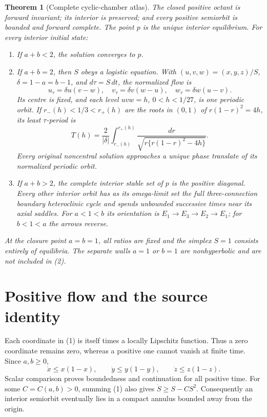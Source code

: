 \documentclass[10pt]{article}
\newtheorem{theorem}{Theorem}
\theoremstyle{remark}
\begin{document}
\begin{theorem}[Complete cyclic-chamber atlas]\label{thm:atlas}
The closed positive octant is forward invariant; its interior is preserved;
and every positive semiorbit is bounded and forward complete.  The point
$p$ is the unique interior equilibrium.  For every interior initial state:
\begin{enumerate}[label=\textup{(\roman*)}]
\item If $a+b<2$, the solution converges to $p$.
\item If $a+b=2$, then $S$ obeys a logistic equation.  With
$(u,v,w)=(x,y,z)/S$, $\delta=1-a=b-1$, and $d\tau=S\,dt$, the normalized
flow is
\begin{equation}
 u_\tau=\delta u(v-w),\quad
 v_\tau=\delta v(w-u),\quad
 w_\tau=\delta w(u-v).
\end{equation}
Its centre is fixed, and each level $uvw=h$, $0<h<1/27$, is one periodic
orbit.  If $r_-(h)<1/3<r_+(h)$ are the roots in $(0,1)$ of
$r(1-r)^2=4h$, its least $\tau$-period is
\begin{equation}
 T(h)=\frac{2}{|\delta|}\int_{r_-(h)}^{r_+(h)}
 \frac{dr}{\sqrt{r\{r(1-r)^2-4h\}}}.
\end{equation}
Every original noncentral solution approaches a unique phase translate of
its normalized periodic orbit.
\item If $a+b>2$, the complete interior stable set of $p$ is the positive
diagonal.  Every other interior orbit has as its omega-limit set the full
three-connection boundary heteroclinic cycle and spends unbounded successive
times near its axial saddles.  For $a<1<b$ its orientation is
$E_1\to E_3\to E_2\to E_1$; for $b<1<a$ the arrows reverse.
\end{enumerate}
At the closure point $a=b=1$, all ratios are fixed and the simplex $S=1$
consists entirely of equilibria.  The separate walls $a=1$ or $b=1$ are
nonhyperbolic and are not included in (2).
\end{theorem}

\section{Positive flow and the source identity}

Each coordinate in (1) is itself times a locally Lipschitz function.  Thus a
zero coordinate remains zero, whereas a positive one cannot vanish at finite
time.  Since $a,b\geq0$,
\[
 \dot x\leq x(1-x),\qquad \dot y\leq y(1-y),\qquad
 \dot z\leq z(1-z).
\]
Scalar comparison proves boundedness and continuation for all positive time.
For some $C=C(a,b)>0$, summing (1) also gives
$\dot S\geq S-CS^2$.  Consequently an interior semiorbit eventually lies in
a compact annulus bounded away from the origin.
\end{document}
